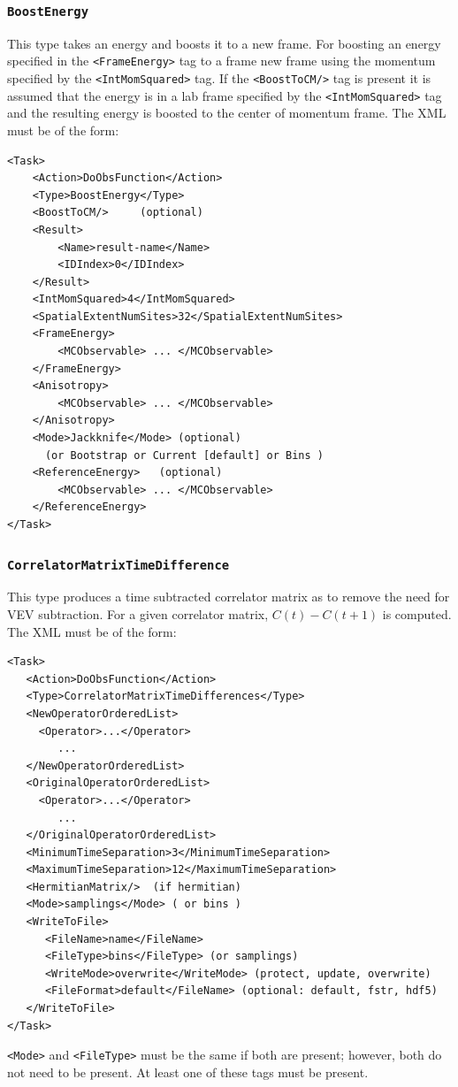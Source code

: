\documentclass[12pt]{article}
\newcommand{\vb}{\texttt}
\begin{document}
\subsubsection{\vb{BoostEnergy}}
This type takes an energy and boosts it to a new frame.
For boosting an energy specified in the \vb{<FrameEnergy>} tag
to a frame new frame using the momentum specified by the
\vb{<IntMomSquared>} tag. If the \vb{<BoostToCM/>} tag is present
it is assumed that the energy is in a lab frame specified by the
\vb{<IntMomSquared>} tag and the resulting energy is boosted to the
center of momentum frame.
The XML must be of the form:
\begin{verbatim}
<Task>
    <Action>DoObsFunction</Action>
    <Type>BoostEnergy</Type>
    <BoostToCM/>     (optional)
    <Result>
        <Name>result-name</Name>
        <IDIndex>0</IDIndex>
    </Result>
    <IntMomSquared>4</IntMomSquared>
    <SpatialExtentNumSites>32</SpatialExtentNumSites>
    <FrameEnergy>
        <MCObservable> ... </MCObservable>
    </FrameEnergy>
    <Anisotropy>
        <MCObservable> ... </MCObservable>
    </Anisotropy>
    <Mode>Jackknife</Mode> (optional)
      (or Bootstrap or Current [default] or Bins )
    <ReferenceEnergy>   (optional)
        <MCObservable> ... </MCObservable>
    </ReferenceEnergy>
</Task>
\end{verbatim}
\subsubsection{\vb{CorrelatorMatrixTimeDifference}}
This type produces a time subtracted
correlator matrix as to remove the need for VEV subtraction. For a given correlator
matrix, $C(t)-C(t+1)$ is computed.
The XML must be of the form:
\begin{verbatim}
<Task>
   <Action>DoObsFunction</Action>
   <Type>CorrelatorMatrixTimeDifferences</Type>
   <NewOperatorOrderedList>
     <Operator>...</Operator>
        ...
   </NewOperatorOrderedList>
   <OriginalOperatorOrderedList>
     <Operator>...</Operator>
        ...
   </OriginalOperatorOrderedList>
   <MinimumTimeSeparation>3</MinimumTimeSeparation>
   <MaximumTimeSeparation>12</MaximumTimeSeparation>
   <HermitianMatrix/>  (if hermitian)
   <Mode>samplings</Mode> ( or bins )
   <WriteToFile>
      <FileName>name</FileName>
      <FileType>bins</FileType> (or samplings)
      <WriteMode>overwrite</WriteMode> (protect, update, overwrite)
      <FileFormat>default</FileName> (optional: default, fstr, hdf5)
   </WriteToFile>
</Task>
\end{verbatim}
\vb{<Mode>} and \vb{<FileType>} must be the same if both are present;
however, both do not need to be present.  At least one of these tags must 
be present.
\end{document}
